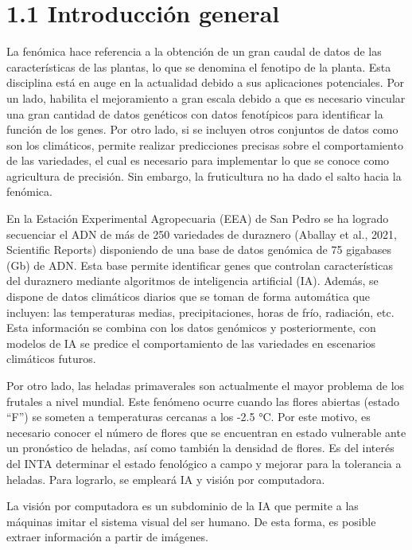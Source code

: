 \documentclass[
11pt, %
codirector, %
]{charter}
\begin{document}
\section{1.1 Introducción general}
\label{sec:descripcion}

La fenómica hace referencia a la obtención de un gran caudal de datos de las características de las plantas, lo que se denomina el fenotipo de la planta. Esta disciplina está en auge en la actualidad debido a sus aplicaciones potenciales. Por un lado, habilita el mejoramiento a gran escala debido a que es necesario vincular una gran cantidad de datos genéticos con datos fenotípicos para identificar la función de los genes. Por otro lado, si se incluyen otros conjuntos de datos como son los climáticos, permite realizar predicciones precisas sobre el comportamiento de las variedades, el cual es necesario para implementar lo que se conoce como agricultura de precisión. Sin embargo, la fruticultura no ha dado el salto hacia la fenómica.

En la  Estación Experimental Agropecuaria (EEA) de San Pedro se ha logrado secuenciar el ADN de más de 250 variedades de duraznero (Aballay et al., 2021, Scientific Reports) disponiendo de una base de datos genómica de 75 gigabases (Gb) de ADN. Esta base permite identificar genes que controlan características del duraznero mediante algoritmos de inteligencia artificial (IA). Además, se dispone de datos climáticos diarios que se toman de forma automática que incluyen: las temperaturas medias, precipitaciones, horas de frío, radiación, etc. Esta información se combina con los datos genómicos y posteriormente, con modelos de IA se predice el comportamiento de las variedades en escenarios climáticos futuros.

Por otro lado, las heladas primaverales son actualmente el mayor problema de los frutales a nivel mundial. Este fenómeno ocurre cuando las flores abiertas (estado “F”) se someten a temperaturas cercanas a los -2.5 °C. Por este motivo, es necesario conocer el número de flores que se encuentran en estado vulnerable ante un pronóstico de heladas, así como también la densidad de flores. Es del interés del INTA determinar el estado fenológico a campo y mejorar para la tolerancia a heladas. Para lograrlo, se empleará IA y visión por computadora.

La visión por computadora es un subdominio de la IA que permite a las máquinas imitar el sistema visual del ser humano. De esta forma, es posible extraer información a partir de imágenes. 
\end{document}
